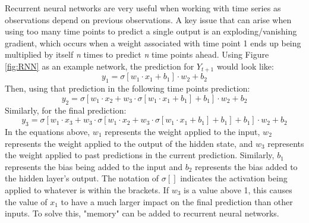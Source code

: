 Recurrent neural networks are very useful when working with time series as observations depend on previous observations. A key issue that can arise when using too many time points to predict a single output is an exploding/vanishing gradient, which occurs when a weight associated with time point 1 ends up being multiplied by itself \textit{n} times to predict \textit{n} time points ahead. Using Figure \ref{fig:RNN} as an example network, the prediction for $Y_{t+1}$ would look like:
\begin{equation*}
    y_1 = \sigma[w_1\cdot x_1 + b_1]\cdot w_2 + b_2
\end{equation*}
Then, using that prediction in the following time points prediction:
\begin{equation*}
    y_2 = \sigma[w_1\cdot x_2 + w_3\cdot\sigma[w_1\cdot x_1 + b_1] + b_1]\cdot w_2 + b_2
\end{equation*}
Similarly, for the final prediction:
\begin{equation*}
    y_3 = \sigma[w_1\cdot x_3 + w_3\cdot \sigma[w_1\cdot x_2 + w_3\cdot\sigma[w_1\cdot x_1 + b_1] + b_1] + b_1]\cdot w_2 + b_2
\end{equation*}
In the equations above, $w_1$ represents the weight applied to the input, $w_2$ represents the weight applied to the output of the hidden state, and $w_3$ represents the weight applied to past predictions in the current prediction. Similarly, $b_1$ represents the bias being added to the input and $b_2$ represents the bias added to the hidden layer's output. The notation of $\sigma[]$ indicates the activation being applied to whatever is within the brackets. If $w_3$ is a value above 1, this causes the value of $x_1$ to have a much larger impact on the final prediction than other inputs. To solve this, "memory" can be added to recurrent neural networks.